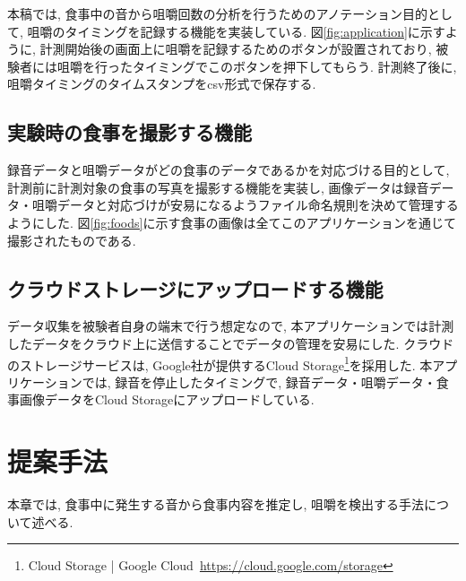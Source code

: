 本稿では, 食事中の音から咀嚼回数の分析を行うためのアノテーション目的として, 咀嚼のタイミングを記録する機能を実装している. 図\ref{fig:application}に示すように, 計測開始後の画面上に咀嚼を記録するためのボタンが設置されており, 被験者には咀嚼を行ったタイミングでこのボタンを押下してもらう. 計測終了後に, 咀嚼タイミングのタイムスタンプをcsv形式で保存する.

\section{実験時の食事を撮影する機能}

録音データと咀嚼データがどの食事のデータであるかを対応づける目的として, 計測前に計測対象の食事の写真を撮影する機能を実装し, 画像データは録音データ・咀嚼データと対応づけが安易になるようファイル命名規則を決めて管理するようにした. 図\ref{fig:foods}に示す食事の画像は全てこのアプリケーションを通じて撮影されたものである.

\section{クラウドストレージにアップロードする機能}

データ収集を被験者自身の端末で行う想定なので, 本アプリケーションでは計測したデータをクラウド上に送信することでデータの管理を安易にした. クラウドのストレージサービスは, Google社が提供するCloud Storage\footnote{Cloud Storage | Google Cloud~\url{https://cloud.google.com/storage}}を採用した. 本アプリケーションでは, 録音を停止したタイミングで, 録音データ・咀嚼データ・食事画像データをCloud Storageにアップロードしている.

\chapter{提案手法}

本章では, 食事中に発生する音から食事内容を推定し, 咀嚼を検出する手法について述べる.

